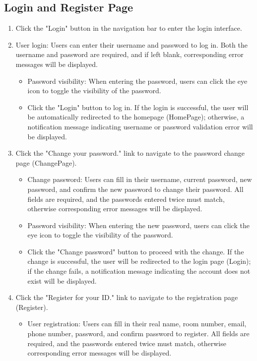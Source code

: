 \documentclass{article}
\begin{document}
\subsection{Login and Register Page}
\begin{enumerate}
    \item Click the "Login" button in the navigation bar to enter the login interface.
    \item User login: Users can enter their username and password to log in. Both the username and password are required, and if left blank, corresponding error messages will be displayed.
    \begin{itemize}
        \item Password visibility: When entering the password, users can click the eye icon to toggle the visibility of the password.
        \item Click the "Login" button to log in. If the login is successful, the user will be automatically redirected to the homepage (HomePage); otherwise, a notification message indicating username or password validation error will be displayed.
    \end{itemize}
    \item Click the "Change your password." link to navigate to the password change page (ChangePage).
    \begin{itemize}
        \item Change password: Users can fill in their username, current password, new password, and confirm the new password to change their password. All fields are required, and the passwords entered twice must match, otherwise corresponding error messages will be displayed.
        \item Password visibility: When entering the new password, users can click the eye icon to toggle the visibility of the password.
        \item Click the "Change password" button to proceed with the change. If the change is successful, the user will be redirected to the login page (Login); if the change fails, a notification message indicating the account does not exist will be displayed.
    \end{itemize}
    \item Click the "Register for your ID." link to navigate to the registration page (Register).
    \begin{itemize}
        \item User registration: Users can fill in their real name, room number, email, phone number, password, and confirm password to register. All fields are required, and the passwords entered twice must match, otherwise corresponding error messages will be displayed.

\end{itemize}
\end{enumerate}
\end{document}
